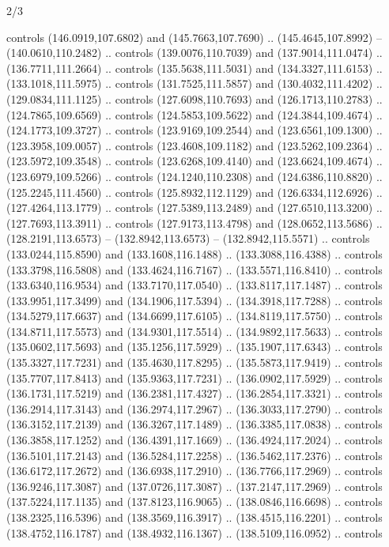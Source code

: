\begin{flagdescription}{2/3}
\begin{scope}[shift={(0.5\flaglength,0.5)},scale=\flagwidth/320]
\begin{scope}[y=0.8pt, x=0.8pt, yscale=-1,shift={(-118.3,-146)}]
  controls (146.0919,107.6802) and (145.7663,107.7690) .. (145.4645,107.8992) --
  (140.0610,110.2482) .. controls (139.0076,110.7039) and (137.9014,111.0474) ..
  (136.7711,111.2664) .. controls (135.5638,111.5031) and (134.3327,111.6153) ..
  (133.1018,111.5975) .. controls (131.7525,111.5857) and (130.4032,111.4202) ..
  (129.0834,111.1125) .. controls (127.6098,110.7693) and (126.1713,110.2783) ..
  (124.7865,109.6569) .. controls (124.5853,109.5622) and (124.3844,109.4674) ..
  (124.1773,109.3727) .. controls (123.9169,109.2544) and (123.6561,109.1300) ..
  (123.3958,109.0057) .. controls (123.4608,109.1182) and (123.5262,109.2364) ..
  (123.5972,109.3548) .. controls (123.6268,109.4140) and (123.6624,109.4674) ..
  (123.6979,109.5266) .. controls (124.1240,110.2308) and (124.6386,110.8820) ..
  (125.2245,111.4560) .. controls (125.8932,112.1129) and (126.6334,112.6926) ..
  (127.4264,113.1779) .. controls (127.5389,113.2489) and (127.6510,113.3200) ..
  (127.7693,113.3911) .. controls (127.9173,113.4798) and (128.0652,113.5686) ..
  (128.2191,113.6573) -- (132.8942,113.6573) -- (132.8942,115.5571) .. controls
  (133.0244,115.8590) and (133.1608,116.1488) .. (133.3088,116.4388) .. controls
  (133.3798,116.5808) and (133.4624,116.7167) .. (133.5571,116.8410) .. controls
  (133.6340,116.9534) and (133.7170,117.0540) .. (133.8117,117.1487) .. controls
  (133.9951,117.3499) and (134.1906,117.5394) .. (134.3918,117.7288) .. controls
  (134.5279,117.6637) and (134.6699,117.6105) .. (134.8119,117.5750) .. controls
  (134.8711,117.5573) and (134.9301,117.5514) .. (134.9892,117.5633) .. controls
  (135.0602,117.5693) and (135.1256,117.5929) .. (135.1907,117.6343) .. controls
  (135.3327,117.7231) and (135.4630,117.8295) .. (135.5873,117.9419) .. controls
  (135.7707,117.8413) and (135.9363,117.7231) .. (136.0902,117.5929) .. controls
  (136.1731,117.5219) and (136.2381,117.4327) .. (136.2854,117.3321) .. controls
  (136.2914,117.3143) and (136.2974,117.2967) .. (136.3033,117.2790) .. controls
  (136.3152,117.2139) and (136.3267,117.1489) .. (136.3385,117.0838) .. controls
  (136.3858,117.1252) and (136.4391,117.1669) .. (136.4924,117.2024) .. controls
  (136.5101,117.2143) and (136.5284,117.2258) .. (136.5462,117.2376) .. controls
  (136.6172,117.2672) and (136.6938,117.2910) .. (136.7766,117.2969) .. controls
  (136.9246,117.3087) and (137.0726,117.3087) .. (137.2147,117.2969) .. controls
  (137.5224,117.1135) and (137.8123,116.9065) .. (138.0846,116.6698) .. controls
  (138.2325,116.5396) and (138.3569,116.3917) .. (138.4515,116.2201) .. controls
  (138.4752,116.1787) and (138.4932,116.1367) .. (138.5109,116.0952) .. controls

\end{scope}
\end{scope}
\end{flagdescription}
